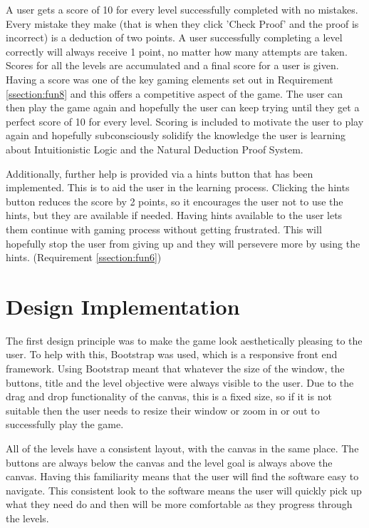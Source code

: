 A user gets a score of 10 for every level successfully completed with no mistakes. Every mistake they make (that is when they click 'Check Proof' and the proof is incorrect) is a deduction of two points. A user successfully completing a level correctly will always receive 1 point, no matter how many attempts are taken. Scores for all the levels are accumulated and a final score for a user is given. Having a score was one of the key gaming elements set out in Requirement \ref{ssection:fun8} and this offers a competitive aspect of the game. The user can then play the game again and hopefully the user can keep trying until they get a perfect score of 10 for every level. Scoring is included to motivate the user to play again and hopefully subconsciously solidify the knowledge the user is learning about Intuitionistic Logic and the Natural Deduction Proof System.  

Additionally, further help is provided via a hints button that has been implemented. This is to aid the user in the learning process. Clicking the hints button reduces the score by 2 points, so it encourages the user not to use the hints, but they are available if needed. Having hints available to the user lets them continue with gaming process without getting frustrated. This will hopefully stop the user from giving up and they will persevere more by using the hints. (Requirement \ref{ssection:fun6})

\section{Design Implementation}

The first design principle was to make the game look aesthetically pleasing to the user. To help with this, Bootstrap was used, which is a responsive front end framework. \cite{Boots82:online} Using Bootstrap meant that whatever the size of the window, the buttons, title and the level objective were always visible to the user. Due to the drag and drop functionality of the canvas, this is a fixed size, so if it is not suitable then the user needs to resize their window or zoom in or out to successfully play the game.

All of the levels have a consistent layout, with the canvas in the same place. The buttons are always below the canvas and the level goal is always above the canvas. Having this familiarity means that the user will find the software easy to navigate. This consistent look to the software means the user will quickly pick up what they need do and then will be more comfortable as they progress through the levels.

